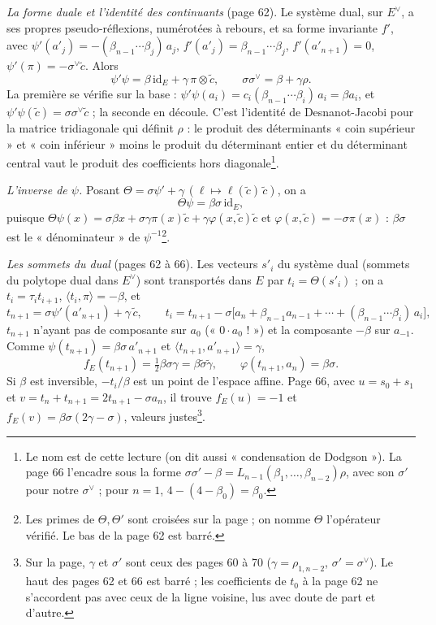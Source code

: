 \documentclass[11pt,a4paper]{article}
\begin{document}
\emph{La forme duale et l'identité des continuants} (page 62). Le système dual,
sur $E^\vee$, a ses propres pseudo-réflexions, numérotées à rebours, et sa forme
invariante $f'$, avec $\psi'(a'_j) = -(\beta_{n-1} \cdots \beta_j)\, a_j$,
$f'(a'_j) = \beta_{n-1} \cdots \beta_j$, $f'(a'_{n+1}) = 0$, $\psi'(\pi) =
-\sigma^\vee \tilde c$. Alors
\[
\psi'\psi = \beta\,\mathrm{id}_E + \gamma\, \pi \otimes \tilde c, \qquad
\boxed{\sigma\sigma^\vee = \beta + \gamma\rho}.
\]
La première se vérifie sur la base : $\psi'\psi(a_i) = c_i (\beta_{n-1} \cdots
\beta_i)\, a_i = \beta a_i$, et $\psi'\psi(\tilde c) = \sigma\sigma^\vee \tilde
c$ ; la seconde en découle. C'est l'identité de Desnanot-Jacobi pour la matrice
tridiagonale qui définit $\rho$ : le produit des déterminants « coin supérieur »
et « coin inférieur » moins le produit du déterminant entier et du déterminant
central vaut le produit des coefficients hors diagonale\footnote{Le nom est de
cette lecture (on dit aussi « condensation de Dodgson »). La page 66 l'encadre
sous la forme $\sigma\sigma' - \beta = L_{n-1}(\beta_1, \ldots,
\beta_{n-2})\rho$, avec son $\sigma'$ pour notre $\sigma^\vee$ ; pour $n = 1$,
$4 - (4 - \beta_0) = \beta_0$.}.

\emph{L'inverse de $\psi$.} Posant $\Theta = \sigma\psi' + \gamma\,(\ell \mapsto
\ell(\tilde c)\,\tilde c)$, on a
\[
\Theta\psi = \beta\sigma\, \mathrm{id}_E ,
\]
puisque $\Theta\psi(x) = \sigma\beta x + \sigma\gamma\pi(x)\tilde c +
\gamma\varphi(x, \tilde c)\tilde c$ et $\varphi(x, \tilde c) = -\sigma\pi(x)$ :
$\beta\sigma$ est le « dénominateur » de $\psi^{-1}$\footnote{Les primes de
$\Theta, \Theta'$ sont croisées sur la page ; on nomme $\Theta$ l'opérateur
vérifié. Le bas de la page 62 est barré.}.

\emph{Les sommets du dual} (pages 62 à 66). Les vecteurs $s'_i$ du système dual
(sommets du polytope dual dans $E^\vee$) sont transportés dans $E$ par
$t_i = \Theta(s'_i)$ ; on a $t_i = \tau_i t_{i+1}$, $\langle t_i, \pi \rangle
= -\beta$, et
\[
t_{n+1} = \sigma\psi'(a'_{n+1}) + \gamma\,\tilde c, \qquad
t_i = t_{n+1} - \sigma\bigl[a_n + \beta_{n-1} a_{n-1} + \cdots + (\beta_{n-1}
\cdots \beta_i)\, a_i\bigr],
\]
$t_{n+1}$ n'ayant pas de composante sur $a_0$ (« $0 \cdot a_0$ ! ») et la
composante $-\beta$ sur $a_{-1}$. Comme $\psi(t_{n+1}) = \beta\sigma\,
a'_{n+1}$ et $\langle t_{n+1}, a'_{n+1} \rangle = \gamma$,
\[
f_E(t_{n+1}) = \tfrac12\beta\sigma\gamma = \beta\tilde\sigma\tilde\gamma ,
\qquad \varphi(t_{n+1}, a_n) = \beta\sigma.
\]
Si $\beta$ est inversible, $-t_i/\beta$ est un point de l'espace affine. Page 66,
avec $u = s_0 + s_1$ et $v = t_n + t_{n+1} = 2t_{n+1} - \sigma a_n$, il trouve
$f_E(u) = -1$ et $f_E(v) = \beta\sigma(2\gamma - \sigma)$, valeurs
justes\footnote{Sur la page, $\gamma$ et $\sigma'$ sont ceux des pages 60 à 70
($\gamma = \rho_{1,n-2}$, $\sigma' = \sigma^\vee$). Le haut des pages 62 et 66
est barré ; les coefficients de $t_0$ à la page 62 ne s'accordent pas avec
ceux de la ligne voisine, lus avec doute de part et d'autre.}.
\end{document}
